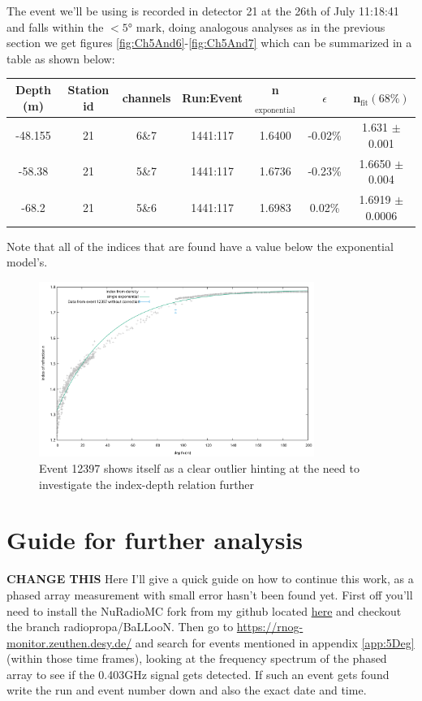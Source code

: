 The event we'll be using is recorded in detector 21 at the 26th of July
11:18:41 and falls within the $<5$° mark, doing analogous analyses as in the
previous section we get figures \ref{fig:Ch5And6}-\ref{fig:Ch5And7} which can
be summarized in a table as shown below:
\begin{center}
\begin{tabular}{||c c c c c c c||}
 \hline
 Depth (m) & Station id & channels & Run:Event & n$_\text{exponential}$ & $\epsilon$ & n$_\text{fit} (68\%)$\\ [0.5ex]
 \hline\hline
 -48.155 & 21 & 6\&7 & 1441:117 & 1.6400 & -0.02\% & 1.631 $\pm$ 0.001 \\
 -58.38 & 21 & 5\&7 & 1441:117 & 1.6736 & -0.23\% & 1.6650 $\pm$ 0.004 \\
 -68.2 & 21 & 5\&6 & 1441:117 & 1.6983 & 0.02\% & 1.6919 $\pm$ 0.0006 \\
 \hline
\end{tabular}
\end{center}
Note that all of the indices that are found have a value below the
exponential model's.
\begin{figure}
	\centering
	\includegraphics[width=0.8\textwidth]{figures/Event12397NoCorr.pdf}
  \caption{Event 12397 shows itself as a clear outlier hinting at the need to investigate the index-depth relation further}
	\label{fig:IndexVSDepth.pdf}
\end{figure}
\section{Guide for further analysis}
\textbf{CHANGE THIS}
Here I'll give a quick guide on how to continue this work, as a phased array
measurement with small error hasn't been found yet.  First off you'll need to
install the NuRadioMC fork from my github located
\href{https://github.com/arthuradriaens-code/NuRadioMC.git}{here} and checkout
the branch radiopropa/BaLLooN. Then go to
\url{https://rnog-monitor.zeuthen.desy.de/} and search for events mentioned in
appendix \ref{app:5Deg} (within those time frames), looking at the frequency
spectrum of the phased array to see if the 0.403GHz signal gets detected. If
such an event gets found write the run and event number down and also the exact
date and time.

